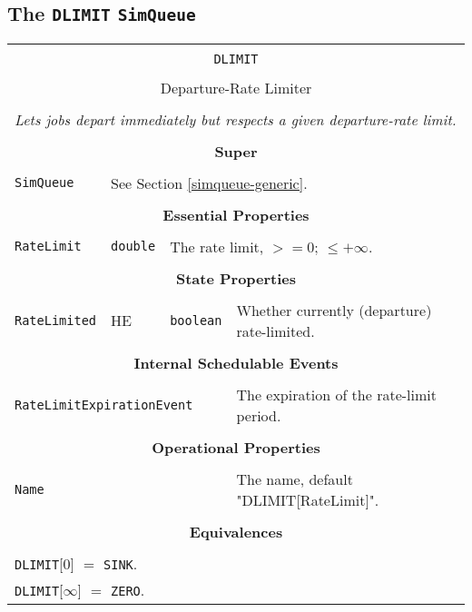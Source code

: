 \documentclass[12pt]{book}
\begin{document}
\subsection{The \lstinline{DLIMIT} \lstinline{SimQueue}}

\begin{tabular}{|l|l|l|l|}
\hline
\multicolumn{4}{|c|}{} \\
\multicolumn{4}{|c|}{\lstinline[basicstyle=\large]{DLIMIT}} \\
\multicolumn{4}{|c|}{} \\
\multicolumn{4}{|c|}{Departure-Rate Limiter} \\
\multicolumn{4}{|c|}{} \\
\hline
\multicolumn{4}{|l|}{\em Lets jobs depart immediately but respects a given departure-rate limit.} \\
\hline
\multicolumn{4}{|c|}{} \\
\multicolumn{4}{|c|}{\bf Super} \\
\multicolumn{4}{|c|}{} \\
\hline
\lstinline|SimQueue| & \multicolumn{3}{|l|}{See Section \ref{simqueue-generic}.} \\
\hline
\multicolumn{4}{|c|}{} \\
\multicolumn{4}{|c|}{\bf Essential Properties} \\
\multicolumn{4}{|c|}{} \\
\hline
\lstinline|RateLimit| & \lstinline|double| & \multicolumn{2}{|l|}{The rate limit, $>= 0$; $\leq +\infty$.} \\
\hline
\multicolumn{4}{|c|}{} \\
\multicolumn{4}{|c|}{\bf State Properties} \\
\multicolumn{4}{|c|}{} \\
\hline
\lstinline|RateLimited| & HE & \lstinline|boolean| & Whether currently (departure) rate-limited. \\
\hline
\multicolumn{4}{|c|}{} \\
\multicolumn{4}{|c|}{\bf Internal Schedulable Events} \\
\multicolumn{4}{|c|}{} \\
\hline
\multicolumn{3}{|l|}{\lstinline|RateLimitExpirationEvent|} & The expiration of the rate-limit period. \\
\hline
\multicolumn{4}{|c|}{} \\
\multicolumn{4}{|c|}{\bf Operational Properties} \\
\multicolumn{4}{|c|}{} \\
\hline
\multicolumn{3}{|l|}{\lstinline|Name|} & The name, default "DLIMIT[RateLimit]". \\
\hline
\multicolumn{4}{|c|}{} \\
\multicolumn{4}{|c|}{\bf Equivalences} \\
\multicolumn{4}{|c|}{} \\
\hline
\multicolumn{4}{|l|}{\lstinline|DLIMIT|[$0$] $=$ \lstinline|SINK|.} \\
\multicolumn{4}{|l|}{\lstinline|DLIMIT|[$\infty$] $=$ \lstinline|ZERO|.} \\
\hline
\end{tabular}
\end{document}

